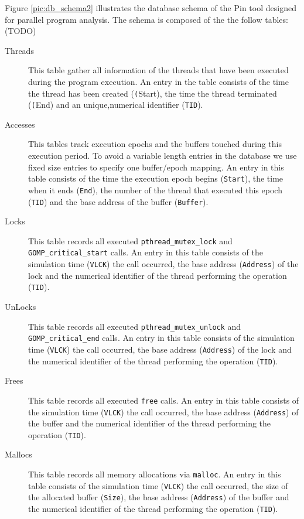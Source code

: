 Figure \ref{pic:db_schema2} illustrates the database
schema of the Pin tool designed for parallel program analysis.
The schema is composed of the the follow tables: (TODO)
\begin{description}
  \item[Threads] This table gather all information of the threads that
    have been executed during the program execution. An entry in the
    table consists of the time the thread has been created
    (\texttt(Start), the time the thread terminated (\texttt(End) and
    an unique,numerical identifier (\texttt{TID}).
  \item[Accesses] This tables track execution epochs and the buffers
    touched during this execution period. To avoid a variable length
    entries in the database we use fixed size entries to specify one
    buffer/epoch mapping. An entry in this table consists of the time
    the execution epoch begins (\texttt{Start}), the time when it ends
    (\texttt{End}), the number of the thread that executed this epoch
    (\texttt{TID}) and the base address of the buffer
    (\texttt{Buffer}).
  \item[Locks] This table records all executed
    \texttt{pthread\_mutex\_lock} and
    \texttt{GOMP\_critical\_start} calls. An entry in this table
    consists of the simulation time (\texttt{VLCK}) the call occurred,
    the base address (\texttt{Address}) of the lock and the
    numerical identifier of the thread performing the operation
    (\texttt{TID}).
  \item[UnLocks] This table records all executed
    \texttt{pthread\_mutex\_unlock} and
    \texttt{GOMP\_critical\_end} calls. An entry in this table
    consists of the simulation time (\texttt{VLCK}) the call occurred,
    the base address (\texttt{Address}) of the lock and the
    numerical identifier of the thread performing the operation
    (\texttt{TID}).
  \item[Frees] This table records all executed \texttt{free} calls. An
    entry in this table consists of the simulation time
    (\texttt{VLCK}) the call occurred, the base address
    (\texttt{Address}) of the buffer and the numerical identifier of
    the thread performing the operation (\texttt{TID}).
  \item[Mallocs] This table records all memory allocations via
    \texttt{malloc}. An entry in this table consists of the simulation
    time (\texttt{VLCK}) the call occurred, the size of the allocated
    buffer (\texttt{Size}), the base address (\texttt{Address}) of
    the buffer and the numerical identifier of
    the thread performing the operation (\texttt{TID}).
\end{description}

